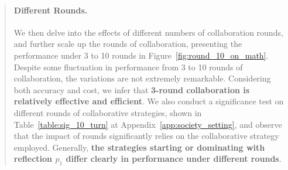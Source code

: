 \documentclass[11pt]{article}
\newcommand{\eg}{\hbox{\emph{e.g.}}\xspace}
\newcommand{\customcomment}[3]{\textcolor{#1}{[#2:#3]}}
\newcommand{\bh}[1]{\customcomment{blue}{BH}{#1}}
\begin{document}
\begin{abstract}
\paragraph{Different Rounds.} 
We then delve into the effects of different numbers of collaboration rounds, and further scale up the rounds of collaboration, presenting the performance under 3 to 10 rounds in Figure~\ref{fig:round_10_on_math}. Despite some fluctuation in performance from 3 to 10 rounds of collaboration, the variations are not extremely remarkable. 
Considering both accuracy and cost, we infer that \textbf{3-round collaboration is relatively effective and efficient}. 
We also conduct a significance test on different rounds of collaborative strategies, shown in Table~\ref{table:sig_10_turn} at Appendix~\ref{app:society_setting}, and observe that the impact of rounds significantly relies on the collaborative strategy employed. Generally, \textbf{the strategies starting or dominating with reflection $p_1$ differ clearly in performance under different rounds}. 


\end{abstract}
\end{document}
